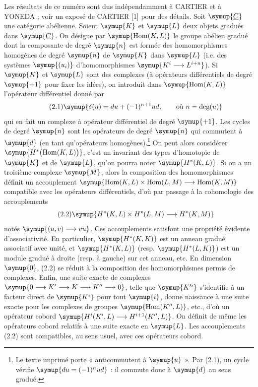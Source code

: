 Les résultats de ce numéro sont dus indépendamment à CARTIER et à YONEDA ; voir
un exposé de CARTIER [1] pour des détails. Soit $\symup{\underline{C}}$ une catégorie abélienne.
Soient $\symup{K}$ et $\symup{L}$ deux objets gradués dans $\symup{\underline{C}}$. On désigne par
$\symup{\operatorname{Hom}(K,L)}$ le groupe abélien gradué dont la composante de degré
$\symup{n}$ est formée des homomorphismes homogènes de degré $\symup{n}$ de $\symup{K}$ dans $\symup{L}$ (i.e.
des systèmes $\symup{(u_i)}$ d'homomorphismes $\symup{K^{i}\longrightarrow L^{i+n}}$).
Si $\symup{K}$ et $\symup{L}$ sont des complexes (à opérateurs différentiels de degré $\symup{+1}$ pour
fixer les idées), on introduit dans $\symup{\operatorname{Hom}(K,L)}$ l'opérateur
différentiel donné par
\begin{equation}\tag{2.1}
  \symup{\delta(u)=du+(-1)^{n+1}ud,\qquad\text{où }n=\deg(u)}
\end{equation}
qui en fait un complexe à opérateur différentiel de degré $\symup{+1}$. Les cycles de
degré $\symup{n}$ sont les opérateurs de degré $\symup{n}$ qui commutent à $\symup{d}$ (en tant
qu'opérateurs homogènes).\footnote{Le texte imprimé porte « anticommutent à $\symup{u}$ ». Par (2.1), un cycle vérifie $\symup{du=(-1)^nud}$ : il commute donc à $\symup{d}$ au sens gradué.} On peut alors considérer
$\symup{H^{*}\bigl(\operatorname{Hom}(K,L)\bigr)}$, c'est un invariant des types
d'homotopie de $\symup{K}$ et de $\symup{L}$, qu'on pourra noter $\symup{H^{*}(K,L)}$.
Si on a un troisième complexe $\symup{M}$, alors la composition des homomorphismes
définit un accouplement
$\symup{\operatorname{Hom}(K,L)\times\operatorname{Hom}(L,M)
\longrightarrow\operatorname{Hom}(K,M)}$ compatible avec les opérateurs différentiels, d'où par passage à la cohomologie
des accouplements
\begin{equation}\tag{2.2}
  \symup{H^{*}(K,L)\times H^{*}(L,M)\longrightarrow H^{*}(K,M)}
\end{equation}
notés $\symup{(u,v)\longrightarrow vu}$. Ces accouplements satisfont une propriété évidente
d'associativité. En particulier, $\symup{H^{*}(K,K)}$ est un anneau gradué associatif
avec unité, et $\symup{H^{*}(K,L)}$ (resp. $\symup{H^{*}(L,K)}$) est un module gradué à droite
(resp. à gauche) sur cet anneau, etc. En dimension $\symup{0}$, (2.2) se réduit à la
composition des homomorphismes permis de complexes. Enfin, une suite exacte de
complexes
$\symup{0\longrightarrow K'\longrightarrow K\longrightarrow K''\longrightarrow 0}$, telle que $\symup{K'^{i}}$ s'identifie à un facteur direct de $\symup{K^{i}}$ pour tout $\symup{i}$,
donne naissance à une suite exacte pour les complexes de groupes
$\symup{\operatorname{Hom}(K'',L)}$, etc., d'où un opérateur cobord
$\symup{H^{i}(K',L)\longrightarrow H^{i+1}(K'',L)}$.
On définit de même les opérateurs cobord relatifs à une suite exacte en $\symup{L}$. Les
accouplements (2.2) sont compatibles, au sens usuel, avec ces opérateurs cobord.

